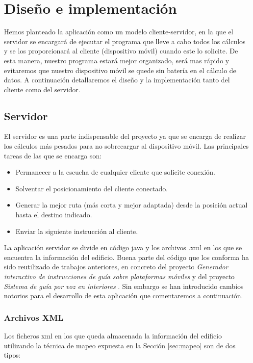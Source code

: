 \chapter{Diseño e implementación}
\label{cap:diseñoeimplementación}


Hemos planteado la aplicación como un modelo cliente-servidor, en la que el servidor se encargará de ejecutar el programa que lleve a cabo todos los cálculos y se los proporcionará al cliente (dispositivo móvil) cuando este lo solicite. De esta manera, nuestro programa estará mejor organizado, será mas rápido y evitaremos que nuestro dispositivo móvil se quede sin batería en el cálculo de datos. A continuación detallaremos el diseño y la implementación tanto del cliente como del servidor.


\section{Servidor}
El servidor es una parte indispensable del proyecto ya que se encarga de realizar los cálculos más pesados para no sobrecargar al dispositivo móvil. Las principales tareas de las que se encarga son:
\begin{itemize}
	\item Permanecer a la escucha de cualquier cliente que solicite conexión.
	\item Solventar el posicionamiento del cliente conectado.
	\item Generar la mejor ruta (más corta y mejor adaptada) desde la posición actual hasta el destino indicado.
	\item Enviar la siguiente instrucción al cliente.	
\end{itemize} 

La aplicación servidor se divide en código java y los archivos .xml en los que se encuentra la información del edificio. Buena parte del código que los conforma ha sido reutilizado de trabajos anteriores, en concreto del proyecto \textit{Generador interactivo de instrucciones de guía sobre plataformas móviles} \citep{TFGguia} y del proyecto \textit{Sistema de guía por voz en interiores} \citep{TFGMariana}. Sin embargo se han introducido cambios notorios para el desarrollo de esta aplicación que comentaremos a continuación.

\subsection{Archivos XML}
Los ficheros xml en los que queda almacenada la información del edificio utilizando la técnica de mapeo expuesta en la Sección \ref{sec:mapeo} son de dos tipos: 

